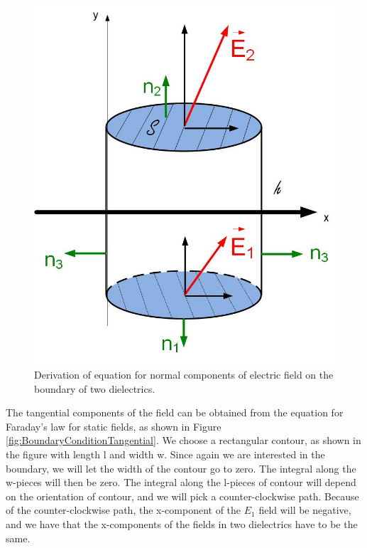 \documentclass{ximera}
\begin{document}
\begin{figure}[htbp]
\begin{center}
\includegraphics[scale=0.5]{../jpg/BoundaryConditionsNormal.jpg}
\end{center}
\caption{Derivation of equation for normal components of electric field on the boundary of two dielectrics.}
\label{fig:BoundaryConditionNormal}
\end{figure}


The tangential components of the field can be obtained from the equation for Faraday's law for static fields, as shown in Figure \ref{fig:BoundaryConditionTangential}. We choose a rectangular contour, as shown in the figure with length l and width w. Since again we are interested in the boundary, we will let the width of the contour go to zero. The integral along the w-pieces will then be zero. The integral along the l-pieces of contour will depend on the orientation of contour, and we will pick a counter-clockwise path. Because of the counter-clockwise path, the x-component of the $E_1$ field will be negative, and we have that the x-components of the fields in two dielectrics have to be the same.
\end{document}
